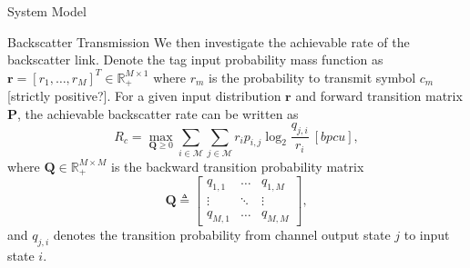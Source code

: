 \documentclass[journal]{IEEEtran}
\begin{document}
\begin{section}{System Model}
\begin{subsection}{Backscatter Transmission}
			We then investigate the achievable rate of the backscatter link. Denote the tag input probability mass function as $\boldsymbol{r} = [r_1,\ldots,r_M]^T \in \mathbb{R}_+^{M \times 1}$ where $r_m$ is the probability to transmit symbol $c_m$ [strictly positive?]. For a given input distribution $\boldsymbol{r}$ and forward transition matrix $\boldsymbol{P}$, the achievable backscatter rate can be written as
			\begin{equation}
				R_c = \max_{\boldsymbol{Q} \ge 0} \sum_{i \in \mathcal{M}} \sum_{j \in \mathcal{M}} r_i p_{i, j} \log_2 \frac{q_{j, i}}{r_i} \ [\si{bpcu}],
				\label{eq:secondary_rate}
			\end{equation}
			where $\boldsymbol{Q} \in \mathbb{R}_{+}^{M \times M}$ is the backward transition probability matrix \cite{Yeung2008}
			\begin{equation}
				\boldsymbol{Q} \triangleq
				\begin{bmatrix}
					q_{1, 1} & \ldots & q_{1, M} \\
					\vdots & \ddots & \vdots \\
					q_{M, 1} & \ldots & q_{M, M}
				\end{bmatrix},
			\end{equation}
			and $q_{j, i}$ denotes the transition probability from channel output state $j$ to input state $i$.
		\end{subsection}


\end{section}
\end{document}
